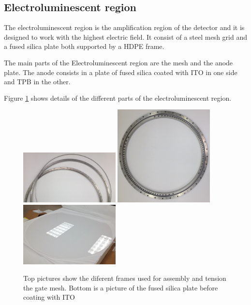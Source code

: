 

\subsection{Electroluminescent region}

The electroluminescent region is the amplification region of the detector and it is designed to work with the highest electric field.
It consist of a steel mesh grid and a fused silica plate both supported by a HDPE frame.

The main parts of the Electroluminescent region are the mesh and the anode plate. The anode consists in a plate of fused silica coated with ITO in one side and TPB in the other. 

Figure \ref{fig:el} shows details of the different parts of the electroluminescent region.

\begin{figure}[h!]
\centering
\includegraphics[width=0.45\textwidth]{img/mesh_grid_1.jpg}
\includegraphics[width=0.45\textwidth]{img/SS_grids_1.jpg}
\includegraphics[width=0.45\textwidth]{img/SiO2_uncoated.jpg}
\caption{Top pictures show the diferent frames used for assembly and tension the gate mesh. Bottom is a picture of the fused silica plate before coating with ITO} \label{fig:el}
\end{figure}





